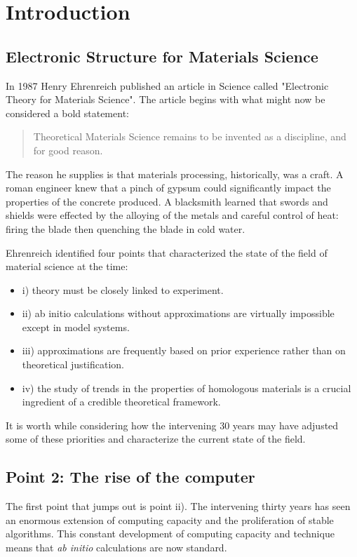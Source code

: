\chapter{Introduction}
\section{Electronic Structure for Materials Science}
In 1987 Henry Ehrenreich published an article in Science called
"Electronic Theory for Materials Science". The article begins
with what might now be considered a bold statement:

\begin{quote}
Theoretical Materials Science remains to be invented as a discipline, and for good reason.
\end{quote}

The reason he supplies is that materials processing, historically, was a craft. 
A roman engineer knew that a pinch of gypsum could significantly impact 
the properties of the concrete produced. A blacksmith learned that swords and shields were 
effected by the alloying of the metals and careful control of heat: 
firing the blade then quenching the blade in cold water.

Ehrenreich identified four points that characterized the state of the field of material science
at the time:
%
\begin{itemize}
\item i) theory must be closely linked to experiment.
\item ii) ab initio calculations without approximations are virtually impossible except in model systems.
\item iii) approximations are frequently based on prior experience rather than on theoretical justification.
\item iv) the study of trends in the properties of homologous materials is a crucial ingredient of a credible theoretical framework.
\end{itemize}
%

It is worth while considering how the intervening 30 years may have adjusted some of 
these priorities and characterize the current state of the field.

\section{Point 2: The rise of the computer}
  The first point that jumps out is point ii). The intervening thirty years
has seen an enormous extension of computing capacity and the proliferation of 
stable algorithms. This constant development of computing capacity and 
technique means that {\it ab initio} calculations are now standard. 

